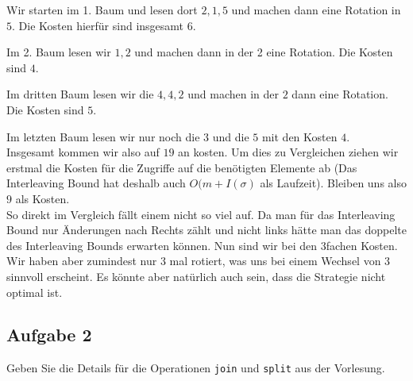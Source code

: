 \documentclass[11pt,a4paper,ngerman]{article}
\begin{document}
Wir starten im 1. Baum und lesen dort $2,1,5$ und machen dann eine Rotation in $5$. Die Kosten hierfür sind insgesamt $6$.

Im 2. Baum lesen wir $1,2$ und machen dann in der 2 eine Rotation. Die Kosten sind $4$.

Im dritten Baum lesen wir die $4,4,2$ und machen in der $2$ dann eine Rotation. Die Kosten sind $5$.

Im letzten Baum lesen wir nur noch die $3$ und die $5$ mit den Kosten $4$.\\

Insgesamt kommen wir also auf $19$ an kosten. Um dies zu Vergleichen ziehen wir erstmal die Kosten für die Zugriffe auf
die benötigten Elemente ab (Das Interleaving Bound hat deshalb auch $O(m + I(\sigma)$ als Laufzeit). Bleiben uns also
$9$ als Kosten.\\

So direkt im Vergleich fällt einem nicht so viel auf. Da man für das Interleaving Bound nur Änderungen nach Rechts zählt und nicht links
hätte man das doppelte des Interleaving Bounds erwarten können. Nun sind wir bei den 3fachen Kosten. Wir haben aber zumindest nur 3 mal rotiert,
   was uns bei einem Wechsel von $3$ sinnvoll erscheint. Es könnte aber natürlich auch sein, dass die Strategie nicht optimal ist.

\subsection*{Aufgabe 2}

Geben Sie die Details für die Operationen \lstinline|join| und \lstinline|split| aus der Vorlesung.
\end{document}
